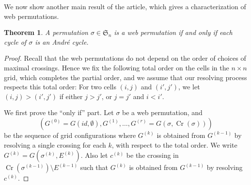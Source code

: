 \documentclass[reqno,12pt]{amsart}
\newtheorem{thm}{Theorem}[section]
\theoremstyle{definition}
\theoremstyle{remark}
\newcommand\Cr{\operatorname{Cr}}
\newcommand\SYM{\mathfrak{S}}
\begin{document}
We now show another main result of the article,
which gives a characterization of web permutations.
\begin{thm} \label{thm:web=andre_cycle}
  A permutation \( \sigma \in \SYM_n \) is a web permutation
  if and only if each cycle of \( \sigma \) is an Andr\'e cycle.
\end{thm}
\begin{proof}
  Recall that the web permutations
  do not depend on the order of choices of maximal crossings.
  Hence we fix the following total order on the cells in the \( n \times n \) 
  grid, which completes the partial order,
  and we assume that our resolving process respects this total order:
  For two cells \( (i,j) \) and \( (i',j') \), we let \( (i,j)>(i',j') \)
  if either \( j>j' \), or \( j=j' \) and \( i<i' \).

  We first prove the ``only if'' part.
  Let \( \sigma \) be a web permutation, and
  \[ (G^{(0)}=G(id, \emptyset), G^{(1)}, \dots, G^{(r)}=G(\sigma, \Cr(\sigma))) \]
  be the sequence of grid configurations
  where \( G^{(k)} \) is obtained from \( G^{(k-1)} \) by resolving a single
  crossing for each \( k \), with respect to the total order.
  We write \( G^{(k)} = G(\sigma^{(k)}, E^{(k)}) \).
  Also let \( c^{(k)} \) be the crossing in \( \Cr(\sigma^{(k-1)})\setminus E^{(k-1)} \)
  such that \( G^{(k)} \) is obtained from \( G^{(k-1)} \) by resolving \( c^{(k)} \).
  


\end{proof}
\end{document}
